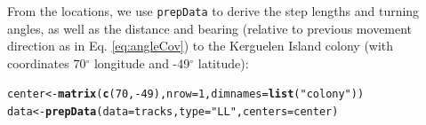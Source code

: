 \documentclass[12pt]{article}\usepackage[]{graphicx}\usepackage[]{xcolor}
\makeatletter
\newcommand{\hlnum}[1]{\textcolor[rgb]{0.686,0.059,0.569}{#1}}%
\newcommand{\hlsng}[1]{\textcolor[rgb]{0.192,0.494,0.8}{#1}}%
\newcommand{\hlopt}[1]{\textcolor[rgb]{0,0,0}{#1}}%
\newcommand{\hldef}[1]{\textcolor[rgb]{0.345,0.345,0.345}{#1}}%
\newcommand{\hlkwb}[1]{\textcolor[rgb]{0.69,0.353,0.396}{#1}}%
\newcommand{\hlkwc}[1]{\textcolor[rgb]{0.333,0.667,0.333}{#1}}%
\newcommand{\hlkwd}[1]{\textcolor[rgb]{0.737,0.353,0.396}{\textbf{#1}}}%
\newenvironment{kframe}{%
 \def\at@end@of@kframe{}%
 \ifinner\ifhmode%
  \def\at@end@of@kframe{\end{minipage}}%
  \begin{minipage}{\columnwidth}%
 \fi\fi%
 \def\FrameCommand##1{\hskip\@totalleftmargin \hskip-\fboxsep
 \colorbox{shadecolor}{##1}\hskip-\fboxsep
     \hskip-\linewidth \hskip-\@totalleftmargin \hskip\columnwidth}%
 \MakeFramed {\advance\hsize-\width
   \@totalleftmargin\z@ \linewidth\hsize
   \@setminipage}}%
 {\par\unskip\endMakeFramed%
 \at@end@of@kframe}
\newenvironment{knitrout}{}{} %
\makeatother
\begin{document}
From the locations, we use \verb|prepData| to derive the step lengths and turning angles, as well as the distance and bearing (relative to previous movement direction as in Eq. \ref{eq:angleCov}) to the Kerguelen Island colony (with coordinates 70$^{\circ}$ longitude and -49$^{\circ}$ latitude):
\begin{knitrout}
\color{fgcolor}\begin{kframe}
\begin{alltt}
\hldef{center} \hlkwb{<-} \hlkwd{matrix}\hldef{(}\hlkwd{c}\hldef{(}\hlnum{70}\hldef{,}\hlopt{-}\hlnum{49}\hldef{),}\hlkwc{nrow}\hldef{=}\hlnum{1}\hldef{,}\hlkwc{dimnames}\hldef{=}\hlkwd{list}\hldef{(}\hlsng{"colony"}\hldef{))}
\hldef{data} \hlkwb{<-} \hlkwd{prepData}\hldef{(}\hlkwc{data}\hldef{=tracks,} \hlkwc{type}\hldef{=}\hlsng{"LL"}\hldef{,} \hlkwc{centers}\hldef{=center)}
\end{alltt}


{\ttfamily\noindent\itshape\color{messagecolor}{\#\# Calculating movement metrics...}}


\end{kframe}
\end{knitrout}
\end{document}
